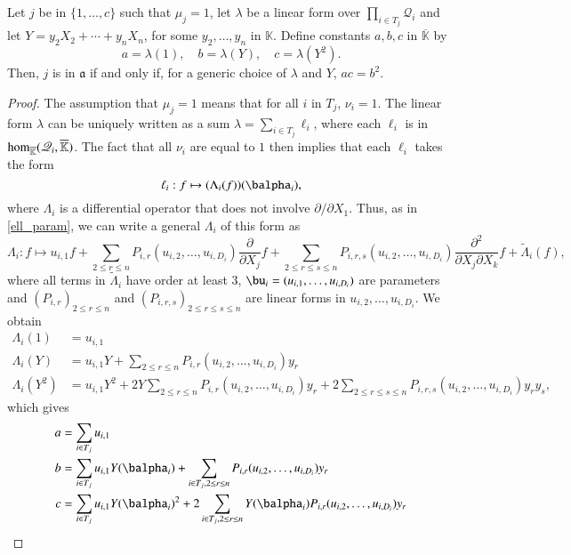 \documentclass[final,1p,times,authoryear]{elsarticle}
\newcommand{\mf}{Y}
\newcommand{\residueI}{\mathscr{Q}}
\def\K{\mathbb{K}}
\def\K {\ensuremath{\mathbb{K}}}
\def\Kbar {{\ensuremath{\overline{\mathbb{K}}}}}
\begin{document}
\begin{lemma}\label{lemma:acb2}
  Let $j$ be in $\{1,\dots,c\}$ such that $\mu_j=1$, let $\lambda$ be
  a linear form over $\prod_{i \in T_j} \residueI_i$ and let $\mf=y_2
  X_2 + \cdots + y_n X_n$, for some $y_2,\dots,y_n$ in $\K$. Define constants
  $a,b,c$ in $\Kbar$ by
  $$a=\lambda(1),\quad b=\lambda(\mf),\quad c=\lambda(\mf^2).$$
  Then, $j$ is in $\mathfrak{a}$
  if and only if, for a generic choice of $\lambda$ and $\mf$, $ac=b^2$.
\end{lemma}
\begin{proof}
  The assumption that $\mu_j=1$ means that for all $i$ in $T_j$,
  $\nu_i=1$. The linear 
  form $\lambda$ can be uniquely written as a sum $\lambda=\sum_{i \in T_j}
  \ell_i$, where each $\ell_i$ is in ${\rm hom}_\Kbar(\residueI_i,\Kbar)$.
  The fact that all $\nu_i$ are equal to $1$ then implies that each $\ell_i$ takes the form 
  $$\ell_i: f \mapsto (\Lambda_{i}(f))(\balpha_i),$$
  where $\Lambda_{i}$ is a differential operator that does not 
  involve $\partial/\partial X_1$. Thus, as in \cref{ell_param}, we can write a general
  $\Lambda_i$ of this form as
  $$\Lambda_i: f \mapsto u_{i,1} f + \sum_{2 \le r \le n}
  P_{i,r}(u_{i,2},\dots,u_{i,D_i}) \frac{\partial}{\partial X_j} f +
  \sum_{2 \le r \le s \le n} P_{i,r,s}(u_{i,2},\dots,u_{i,D_i})
  \frac{\partial^2}{\partial X_j\partial X_k} f +
  \tilde\Lambda_i(f),$$ where all terms in $\tilde \Lambda_i$ have
  order at least $3$, $\bu_i=(u_{i,1},\dots,u_{i,D_i})$ are parameters and
  $(P_{i,r})_{2 \le r \le n}$ and $(P_{i,r,s})_{2 \le r \le s \le n}$
  are linear forms in $u_{i,2},\dots,u_{i,D_i}$.
  We obtain
  \begin{align*}
    \Lambda_i(1)   &= u_{i,1} \\
    \Lambda_i(\mf)   &= u_{i,1} \mf +\sum_{2 \le r \le n}P_{i,r}(u_{i,2},\dots,u_{i,D_i})y_r \\
    \Lambda_i(\mf^2) &= u_{i,1} \mf^2  +2 \mf \sum_{2 \le r \le n}P_{i,r}(u_{i,2},\dots,u_{i,D_i})y_r + 
    2\sum_{2 \le r \le s \le n} P_{i,r,s}(u_{i,2},\dots,u_{i,D_i})y_ry_s,
  \end{align*}
  which gives
  \begin{align*}
    a  &= \sum_{i\in T_j}u_{i,1} \\
    b  &= \sum_{i\in T_j}u_{i,1} \mf(\balpha_i) +\sum_{i \in T_j, 2 \le r \le n}P_{i,r}(u_{i,2},\dots,u_{i,D_i})y_r \\
    c &= \sum_{i\in T_j}u_{i,1} \mf(\balpha_i)^2  +2  \sum_{i \in T_j, 2 \le r \le n}\mf(\balpha_i) P_{i,r}(u_{i,2},\dots,u_{i,D_i})y_r    

\end{align*}
\end{proof}
\end{document}
